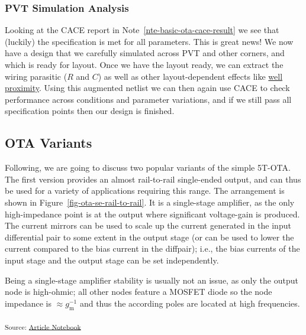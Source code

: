 \documentclass[
  a4paper,
  DIV=11,
  numbers=noendperiod]{scrartcl}
\begin{document}
\subsubsection{PVT Simulation Analysis}\label{pvt-simulation-analysis}

Looking at the CACE report in Note~\ref{nte-basic-ota-cace-result} we
see that (luckily) the specification is met for all parameters. This is
great news! We now have a design that we carefully simulated across PVT
and other corners, and which is ready for layout. Once we have the
layout ready, we can extract the wiring parasitic (\(R\) and \(C\)) as
well as other layout-dependent effects like
\href{https://global.oup.com/us/companion.websites/9780195170153/pdf/proximityeffectmodels.pdf}{well
proximity}. Using this augmented netlist we can then again use CACE to
check performance across conditions and parameter variations, and if we
still pass all specification points then our design is finished.

\subsection{OTA Variants}\label{sec-ota-variants-single-ended}

Following, we are going to discuss two popular variants of the simple
5T-OTA. The first version provides an almost rail-to-rail single-ended
output, and can thus be used for a variety of applications requiring
this range. The arrangement is shown in
Figure~\ref{fig-ota-se-rail-to-rail}. It is a single-stage amplifier, as
the only high-impedance point is at the output where significant
voltage-gain is produced. The current mirrors can be used to scale up
the current generated in the input differential pair to some extent in
the output stage (or can be used to lower the current compared to the
bias current in the diffpair); i.e., the bias currents of the input
stage and the output stage can be set independently.

Being a single-stage amplifier stability is usually not an issue, as
only the output node is high-ohmic; all other nodes feature a MOSFET
diode so the node impedance is \(\approx g_\mathrm{m}^{-1}\) and thus
the according poles are located at high frequencies.

\textsubscript{Source:
\href{https://iic-jku.github.io/analog-circuit-design/index.qmd.html}{Article
Notebook}}
\end{document}
